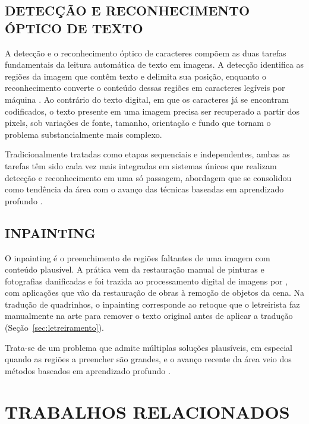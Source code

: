 \documentclass[
    12pt,
    openright,
    oneside,
    a4paper,
    chapter=TITLE,
    section=TITLE,
    english,
    brazilian,
    brazil
]{abntex2}
\begin{document}
\section{DETECÇÃO E RECONHECIMENTO ÓPTICO DE TEXTO}
\label{sec:ocr}

A detecção e o reconhecimento óptico de caracteres compõem as duas tarefas fundamentais da leitura automática de texto em imagens. A detecção identifica as regiões da imagem que contêm texto e delimita sua posição, enquanto o reconhecimento converte o conteúdo dessas regiões em caracteres legíveis por máquina \cite{long2020scenetextdetectionrecognition}. Ao contrário do texto digital, em que os caracteres já se encontram codificados, o texto presente em uma imagem precisa ser recuperado a partir dos pixels, sob variações de fonte, tamanho, orientação e fundo que tornam o problema substancialmente mais complexo.

Tradicionalmente tratadas como etapas sequenciais e independentes, ambas as tarefas têm sido cada vez mais integradas em sistemas únicos que realizam detecção e reconhecimento em uma só passagem, abordagem que se consolidou como tendência da área com o avanço das técnicas baseadas em aprendizado profundo \cite{long2020scenetextdetectionrecognition}.

\section{INPAINTING}
\label{sec:inpainting}

O inpainting é o preenchimento de regiões faltantes de uma imagem com conteúdo plausível. A prática vem da restauração manual de pinturas e fotografias danificadas e foi trazida ao processamento digital de imagens por , com aplicações que vão da restauração de obras à remoção de objetos da cena. Na tradução de quadrinhos, o inpainting corresponde ao retoque que o letreirista faz manualmente na arte para remover o texto original antes de aplicar a tradução (Seção~\ref{sec:letreiramento}).

Trata-se de um problema que admite múltiplas soluções plausíveis, em especial quando as regiões a preencher são grandes, e o avanço recente da área veio dos métodos baseados em aprendizado profundo \cite{quan2024deeplearningbasedimagevideo}.

\chapter{TRABALHOS RELACIONADOS}
\label{cap:trabalhos-relacionados}
\end{document}
